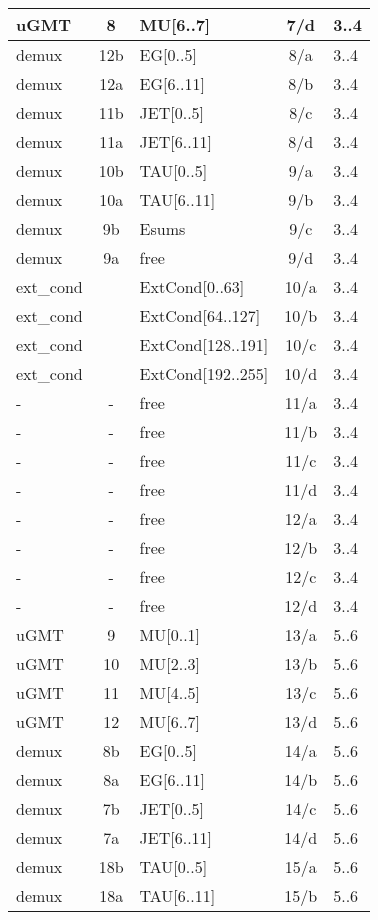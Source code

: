 \begin{longtable}{|l|c|l|c|l|}
uGMT  & 8   & MU[6..7]   & 7/d  & 3..4 \\\hline
demux & 12b & EG[0..5]   & 8/a  & 3..4 \\\hline
demux & 12a & EG[6..11]  & 8/b  & 3..4 \\\hline
demux & 11b & JET[0..5]  & 8/c  & 3..4 \\\hline
demux & 11a & JET[6..11] & 8/d  & 3..4 \\\hline
demux & 10b & TAU[0..5]  & 9/a  & 3..4 \\\hline
demux & 10a & TAU[6..11] & 9/b  & 3..4 \\\hline
demux & 9b  & Esums      & 9/c  & 3..4 \\\hline
demux & 9a  & free      & 9/d  & 3..4 \\\hline
ext\_cond &     & ExtCond[0..63]    & 10/a & 3..4 \\\hline
ext\_cond &     & ExtCond[64..127]  & 10/b & 3..4 \\\hline
ext\_cond &     & ExtCond[128..191] & 10/c & 3..4 \\\hline
ext\_cond &     & ExtCond[192..255] & 10/d & 3..4 \\\hline
- & - & free & 11/a & 3..4 \\\hline
- & - & free & 11/b & 3..4 \\\hline
- & - & free & 11/c & 3..4 \\\hline
- & - & free & 11/d & 3..4 \\\hline
- & - & free & 12/a & 3..4 \\\hline
- & - & free & 12/b & 3..4 \\\hline
- & - & free & 12/c & 3..4 \\\hline
- & - & free & 12/d & 3..4 \\\hline
\hline
uGMT  & 9   & MU[0..1]   & 13/a & 5..6 \\\hline
uGMT  & 10  & MU[2..3]   & 13/b & 5..6 \\\hline
uGMT  & 11  & MU[4..5]   & 13/c & 5..6 \\\hline
uGMT  & 12  & MU[6..7]   & 13/d & 5..6 \\\hline
demux & 8b  & EG[0..5]   & 14/a & 5..6 \\\hline
demux & 8a  & EG[6..11]  & 14/b & 5..6 \\\hline
demux & 7b  & JET[0..5]  & 14/c & 5..6 \\\hline
demux & 7a  & JET[6..11] & 14/d & 5..6 \\\hline
demux & 18b & TAU[0..5]  & 15/a & 5..6 \\\hline
demux & 18a & TAU[6..11] & 15/b & 5..6 \\\hline

\end{longtable}
